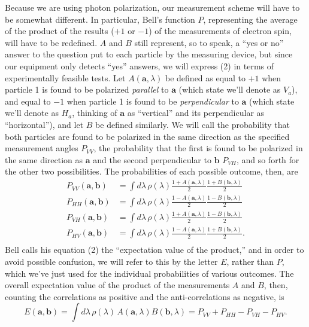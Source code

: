 Because we are using photon polarization, our measurement scheme will have to be somewhat different.
In particular, Bell's function $P$, representing the average of the product of the results ($+1$ or $-1$)
of the measurements of electron spin, will have to be redefined. $A$ and $B$ still represent, so to
speak, a ``yes or no'' answer to the question put to each particle by the measuring device, but since
our equipment only detects ``yes'' answers, we will express (2) in terms of experimentally feasible 
tests. Let $A(\pmb{a},\lambda)$ be defined as equal to $+1$ when particle 1 is found to be polarized 
\emph{parallel} to $\pmb{a}$ (which state we'll denote as $V_a$), and equal to $-1$ when particle 1 
is found to be \emph{perpendicular} to $\pmb{a}$ (which state we'll denote as $H_a$, thinking of $\pmb{a}$
as ``vertical'' and its perpendicular as ``horizontal''), and let $B$ be defined similarly. We will call the 
probability that both particles are found to be polarized in the same direction as the specified measurement 
angles $P_{VV}$, the probability that the first is found to be polarized in the same direction as $\pmb{a}$ and the second perpendicular to $\pmb{b}$ 
$P_{VH}$, and so forth for the other two possibilities. The probabilities of each possible outcome, 
then, are
\begin{align*}
P_{VV}(\pmb{a},\pmb{b}) &= \int d\lambda\, \rho(\lambda) \frac{1+A(\pmb{a},\lambda)}{2}\frac{1+B(\pmb{b},\lambda)}{2}\\
P_{HH}(\pmb{a},\pmb{b}) &= \int d\lambda\, \rho(\lambda) \frac{1-A(\pmb{a},\lambda)}{2}\frac{1-B(\pmb{b},\lambda)}{2}\\
P_{VH}(\pmb{a},\pmb{b}) &= \int d\lambda\, \rho(\lambda) \frac{1+A(\pmb{a},\lambda)}{2}\frac{1-B(\pmb{b},\lambda)}{2}\\
P_{HV}(\pmb{a},\pmb{b}) &= \int d\lambda\, \rho(\lambda) \frac{1-A(\pmb{a},\lambda)}{2}\frac{1+B(\pmb{b},\lambda)}{2}.\\
\end{align*}
Bell calls his equation (2) the ``expectation value of the product,'' and in order to avoid possible confusion,
we will refer to this by the letter $E$, rather than $P$, which we've just used for the individual probabilities
of various outcomes. The overall expectation value of the product of the measurements $A$ and $B$, then, counting the correlations as positive and the anti-correlations as negative, is
\begin{equation*}\tag{R1}
E(\pmb{a},\pmb{b}) = \int d\lambda\, \rho(\lambda)\, A(\pmb{a},\lambda)B(\pmb{b},\lambda) = P_{VV}  + P_{HH} - P_{VH} - P_{HV}.
\end{equation*}
